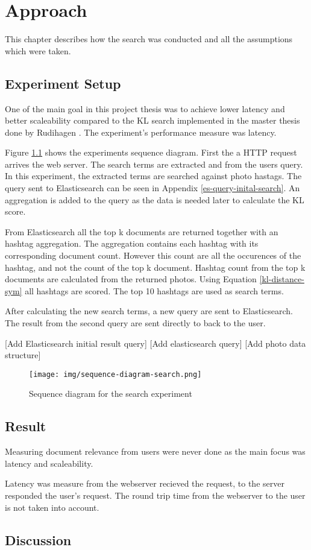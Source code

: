 \chapter{Approach}
\label{ch:approach}
This chapter describes how the search was conducted and all the assumptions which were taken.

\section{Experiment Setup}
One of the main goal in this project thesis was to achieve lower latency and better scaleability compared to the KL search implemented in the master thesis done by Rudihagen \cite{master-thesis}.
The experiment's performance measure was latency.

Figure \ref{fig:sequence-diagram-search} shows the experiments sequence diagram.
First the a HTTP request arrives the web server.
The search terms are extracted and from the users query.
In this experiment, the extracted terms are searched against photo hastags.
The query sent to Elasticsearch can be seen in Appendix \ref{es-query-inital-search}.
An aggregation is added to the query as the data is needed later to calculate the KL score.

From Elasticsearch all the top k documents are returned together with an hashtag aggregation.
The aggregation contains each hashtag with its corresponding document count.
However this count are all the occurences of the hashtag, and not the count of the top k document.
Hashtag count from the top k documents are calculated from the returned photos.
Using Equation \ref{kl-distance-sym} all hashtags are scored.
The top 10 hashtags are used as search terms.

After calculating the new search terms, a new query are sent to Elasticsearch.
The result from the second query are sent directly to back to the user.

[Add Elasticsearch initial result query]
[Add elasticsearch query]
[Add photo data structure]

\begin{figure}[h!]
\centering \texttt{[image: img/sequence-diagram-search.png]}
\caption{Sequence diagram for the search experiment}
\label{fig:sequence-diagram-search}
\end{figure}

\section{Result}
Measuring document relevance from users were never done as the main focus was latency and scaleability.

Latency was measure from the webserver recieved the request, to the server responded the user's request.
The round trip time from the webserver to the user is not taken into account.

\section{Discussion}
